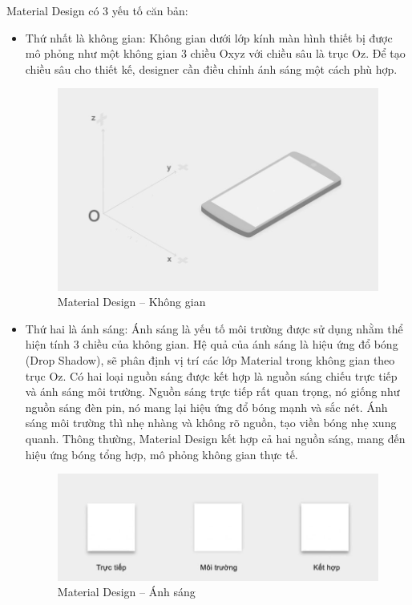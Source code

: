 Material Design có 3 yếu tố căn bản:
\begin{itemize}[topsep=0ex]
\item Thứ nhất là không gian: 
    Không gian dưới lớp kính màn hình thiết bị được mô phỏng
    như một không gian 3 chiều Oxyz với chiều sâu là trục Oz.
    Để tạo chiều sâu cho thiết kế, designer cần điều chỉnh ánh
    sáng một cách phù hợp.

\begin{figure}[H]
\centering
\includegraphics[width=12cm]{images/material-design-space.jpg}
\caption{Material Design – Không gian}
\end{figure}

\item Thứ hai là ánh sáng:
    Ánh sáng là yếu tố môi trường được sử dụng nhằm thể
    hiện tính 3 chiều của không gian. Hệ quả của ánh sáng là hiệu ứng
    đổ bóng (Drop Shadow), sẽ phân định vị trí các lớp Material trong
    không gian theo trục Oz. Có hai loại nguồn sáng được kết hợp
    là nguồn sáng chiếu trực tiếp và ánh sáng môi trường. Nguồn sáng
    trực tiếp rất quan trọng, nó giống như nguồn sáng đèn pin,
    nó mang lại hiệu ứng đổ bóng mạnh và sắc nét. Ánh sáng môi trường
    thì nhẹ nhàng và không rõ nguồn, tạo viền bóng nhẹ xung quanh.
    Thông thường, Material Design kết hợp cả hai nguồn sáng, mang
    đến hiệu ứng bóng tổng hợp, mô phỏng không gian thực tế.

\begin{figure}[H]
\centering
\includegraphics[width=14cm]{images/material-design-light.jpg}
\caption{Material Design – Ánh sáng}
\end{figure}


\end{itemize}
